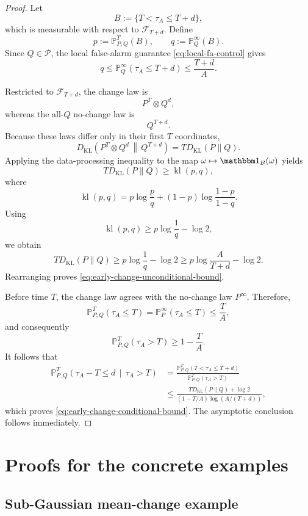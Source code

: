 \documentclass[12pt]{article}
\theoremstyle{spaced}
\theoremstyle{remark}
\begin{document}
\begin{proof}
Let
\[
B:=\{T<\tau_A\le T+d\},
\]
which is measurable with respect to $\mathcal F_{T+d}$. Define
\[
p:=\mathbb P_{P,Q}^{T}(B),
\qquad
q:=\mathbb P_Q^\infty(B).
\]
Since $Q\in\mathcal P$, the local false-alarm guarantee
\eqref{eq:local-fa-control} gives
\[
q
\le
\mathbb P_Q^\infty(\tau_A\le T+d)
\le
\frac{T+d}{A}.
\]

Restricted to $\mathcal F_{T+d}$, the change law is
\[
P^T\otimes Q^d,
\]
whereas the all-$Q$ no-change law is
\[
Q^{T+d}.
\]
Because these laws differ only in their first $T$ coordinates,
\[
D_{\mathrm{KL}}
\left(
P^T\otimes Q^d
\,\middle\|\,
Q^{T+d}
\right)
=
T D_{\mathrm{KL}}(P\|Q).
\]
Applying the data-processing inequality to the map
$\omega\mapsto\mathbbm 1_B(\omega)$ yields
\[
T D_{\mathrm{KL}}(P\|Q)
\ge
\operatorname{kl}(p,q),
\]
where
\[
\operatorname{kl}(p,q)
=
p\log\frac pq
+
(1-p)\log\frac{1-p}{1-q}.
\]
Using
\[
\operatorname{kl}(p,q)
\ge
p\log\frac1q-\log 2,
\]
we obtain
\[
T D_{\mathrm{KL}}(P\|Q)
\ge
p\log\frac1q-\log 2
\ge
p\log\frac{A}{T+d}-\log 2.
\]
Rearranging proves \eqref{eq:early-change-unconditional-bound}.

Before time $T$, the change law agrees with the no-change law
$P^\infty$. Therefore,
\[
\mathbb P_{P,Q}^{T}(\tau_A\le T)
=
\mathbb P_P^\infty(\tau_A\le T)
\le
\frac{T}{A},
\]
and consequently
\[
\mathbb P_{P,Q}^{T}(\tau_A>T)
\ge
1-\frac{T}{A}.
\]
It follows that
\begin{align*}
\mathbb P_{P,Q}^{T}
\left(
\tau_A-T\le d
\,\middle|\,
\tau_A>T
\right)
&=
\frac{
\mathbb P_{P,Q}^{T}(T<\tau_A\le T+d)
}{
\mathbb P_{P,Q}^{T}(\tau_A>T)
} \\
&\le
\frac{
T D_{\mathrm{KL}}(P\|Q)+\log 2
}{
(1-T/A)\log\!\left(A/(T+d)\right)
},
\end{align*}
which proves \eqref{eq:early-change-conditional-bound}.
 The asymptotic conclusion follows
immediately.
\end{proof}


\section{Proofs for the concrete examples}\label{app:example-proofs}

\subsection{Sub-Gaussian mean-change example}\label{app:proof-sub-Gaussian}
\end{document}
